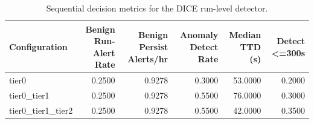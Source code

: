 \begin{table}[t]
\centering
\caption{Sequential decision metrics for the DICE run-level detector.}
\label{tab:dice_sequential_metrics}
\footnotesize
\begin{tabular}{lrrrrr}
\toprule
Configuration & Benign Run-Alert Rate & Benign Persist Alerts/hr & Anomaly Detect Rate & Median TTD (s) & Detect <=300s \\
\midrule
tier0 & 0.2500 & 0.9278 & 0.3000 & 53.0000 & 0.2000 \\
tier0_tier1 & 0.2500 & 0.9278 & 0.5500 & 76.0000 & 0.3000 \\
tier0_tier1_tier2 & 0.2500 & 0.9278 & 0.5500 & 42.0000 & 0.3500 \\
\bottomrule
\end{tabular}

\end{table}
